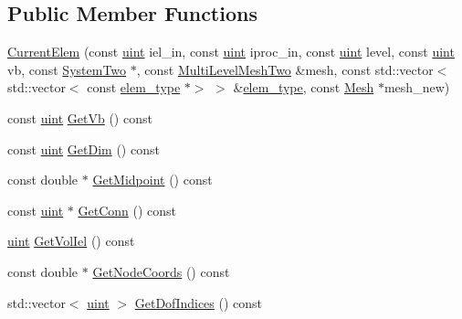 \subsection*{Public Member Functions}
\begin{DoxyCompactItemize}
\item 
\mbox{\hyperlink{classfemus_1_1_current_elem_ae833a5c35d89b95fdfafb44050bdb5d7}{Current\+Elem}} (const \mbox{\hyperlink{_typedefs_8hpp_a91ad9478d81a7aaf2593e8d9c3d06a14}{uint}} iel\+\_\+in, const \mbox{\hyperlink{_typedefs_8hpp_a91ad9478d81a7aaf2593e8d9c3d06a14}{uint}} iproc\+\_\+in, const \mbox{\hyperlink{_typedefs_8hpp_a91ad9478d81a7aaf2593e8d9c3d06a14}{uint}} level, const \mbox{\hyperlink{_typedefs_8hpp_a91ad9478d81a7aaf2593e8d9c3d06a14}{uint}} vb, const \mbox{\hyperlink{classfemus_1_1_system_two}{System\+Two}} $\ast$, const \mbox{\hyperlink{classfemus_1_1_multi_level_mesh_two}{Multi\+Level\+Mesh\+Two}} \&mesh, const std\+::vector$<$ std\+::vector$<$ const \mbox{\hyperlink{classfemus_1_1elem__type}{elem\+\_\+type}} $\ast$$>$ $>$ \&\mbox{\hyperlink{classfemus_1_1elem__type}{elem\+\_\+type}}, const \mbox{\hyperlink{classfemus_1_1_mesh}{Mesh}} $\ast$mesh\+\_\+new)
\item 
const \mbox{\hyperlink{_typedefs_8hpp_a91ad9478d81a7aaf2593e8d9c3d06a14}{uint}} \mbox{\hyperlink{classfemus_1_1_current_elem_ab41f6f8c70c2c128e80a709142d4d7cb}{Get\+Vb}} () const
\item 
const \mbox{\hyperlink{_typedefs_8hpp_a91ad9478d81a7aaf2593e8d9c3d06a14}{uint}} \mbox{\hyperlink{classfemus_1_1_current_elem_ac6bc91c21dfa57288d52e107421bc013}{Get\+Dim}} () const
\item 
const double $\ast$ \mbox{\hyperlink{classfemus_1_1_current_elem_aa4b96cd952c803dad64644067d528372}{Get\+Midpoint}} () const
\item 
const \mbox{\hyperlink{_typedefs_8hpp_a91ad9478d81a7aaf2593e8d9c3d06a14}{uint}} $\ast$ \mbox{\hyperlink{classfemus_1_1_current_elem_a214686cf1fc812970e6841907da0487b}{Get\+Conn}} () const
\item 
\mbox{\hyperlink{_typedefs_8hpp_a91ad9478d81a7aaf2593e8d9c3d06a14}{uint}} \mbox{\hyperlink{classfemus_1_1_current_elem_ae6de3a26fe4c3139e814bb40d62929e2}{Get\+Vol\+Iel}} () const
\item 
const double $\ast$ \mbox{\hyperlink{classfemus_1_1_current_elem_a7d67d0254c2bfcd1405bef6dfbc76fe6}{Get\+Node\+Coords}} () const
\item 
std\+::vector$<$ \mbox{\hyperlink{_typedefs_8hpp_a91ad9478d81a7aaf2593e8d9c3d06a14}{uint}} $>$ \mbox{\hyperlink{classfemus_1_1_current_elem_a0a056fc0356898983b18a52464e77567}{Get\+Dof\+Indices}} () const
$$
\end{DoxyCompactItemize}
